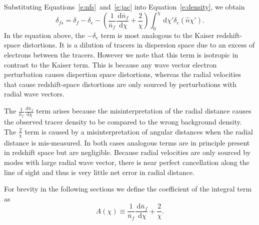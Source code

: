 \documentclass[twocolumn,prl,nofootinbib,floatfix]{revtex4-1}
\makeatletter
\newcommand{\ud}{\,\mathrm{d}}
\def\ignorespacesandimplicitepars{%
  \begingroup
  \catcode13=10
  \@ifnextchar\relax
    {\endgroup}%
    {\endgroup}%
}
\renewcommand{\section}[1]{\emph{#1}---\ignorespacesandimplicitepars}
\makeatother
\begin{document}
Substituting Equations~\ref{e:nfs}~and~\ref{e:jac} into Equation~\ref{e:density},
we obtain
\begin{equation}
\label{e:delta_s}
    \delta_{fs} = \delta_f - \delta_e
    - \left(\frac{1}{\bar{n}_f}\frac{\ud \bar{n}_f}{\ud \chi}
    + \frac{2}{\chi} \right)
        \int_0^\chi \ud \chi' \delta_e(\hat n \chi').
\end{equation}
In the equation above, the $-\delta_e$ term is most analogous to the Kaiser
redshift-space distortions.  It is a dilution of tracers in dispersion space due to an
excess of electrons between the tracers. However we note that this term is isotropic
in contrast to the Kaiser term.  This is because any wave vector electron perturbation
causes dispertion space distortions, whereas the radial velocities that cause
redshift-space distortions are only sourced by perturbations with radial wave
vectors.

The $\frac{1}{\bar{n}_f}\frac{\ud \bar{n}_f}{\ud \chi}$ term arises because the
misinterpretation of the radial distance causes the observed tracer density to
be compared to the wrong background density. The $\frac{2}{\chi}$ term is
caused by a misinterpretation of angular distances when the radial distance is
mis-measured.  In both cases analogous terms are in principle present in 
redshift space but are
negligible. Because radial velocities are only sourced by modes with large
radial wave vector, there is near perfect cancellation along the line of sight
and thus is very little net error in radial distance.

For brevity in the following sections we define the coefficient of the integral
term as
\begin{equation}
    \label{e:A}
    A(\chi) \equiv \frac{1}{\bar{n}_f}\frac{\ud \bar{n}_f}{\ud \chi}
    + \frac{2}{\chi}.
\end{equation}


\end{document}
